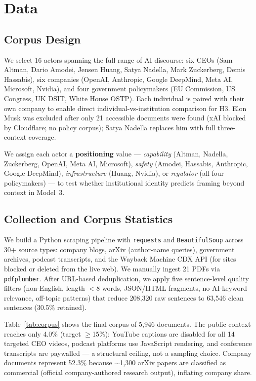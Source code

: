 \documentclass[11pt,a4paper,twocolumn]{article}
\begin{document}
\section{Data}

\subsection{Corpus Design}

We select 16 actors spanning the full range of AI discourse: six CEOs (Sam
Altman, Dario Amodei, Jensen Huang, Satya Nadella, Mark Zuckerberg, Demis
Hassabis), six companies (OpenAI, Anthropic, Google DeepMind, Meta AI,
Microsoft, Nvidia), and four government policymakers (EU Commission, US Congress,
UK DSIT, White House OSTP). Each individual is paired with their own company
to enable direct individual-vs-institution comparison for H3. Elon Musk was
excluded after only 21 accessible documents were found (xAI blocked by
Cloudflare; no policy corpus); Satya Nadella replaces him with full
three-context coverage.

We assign each actor a \textbf{positioning} value — \textit{capability}
(Altman, Nadella, Zuckerberg, OpenAI, Meta AI, Microsoft), \textit{safety}
(Amodei, Hassabis, Anthropic, Google DeepMind), \textit{infrastructure}
(Huang, Nvidia), or \textit{regulator} (all four policymakers) — to test
whether institutional identity predicts framing beyond context in Model~3.

\subsection{Collection and Corpus Statistics}

We build a Python scraping pipeline with \texttt{requests} and
\texttt{BeautifulSoup} across 30+ source types: company blogs, arXiv
(author-name queries), government archives, podcast transcripts, and the
Wayback Machine CDX API (for sites blocked or deleted from the live web).
We manually ingest 21 PDFs via \texttt{pdfplumber}. After URL-based
deduplication, we apply five sentence-level quality filters
(non-English, length $<$8 words, JSON/HTML fragments, no AI-keyword relevance,
off-topic patterns) that reduce 208,320 raw sentences to 63,546 clean
sentences (30.5\% retained).

Table~\ref{tab:corpus} shows the final corpus of 5,946 documents.
The public context reaches only 4.0\% (target $\geq$15\%): YouTube captions
are disabled for all 14 targeted CEO videos, podcast platforms use
JavaScript rendering, and conference transcripts are paywalled — a structural
ceiling, not a sampling choice. Company documents represent 52.3\% because
$\sim$1{,}300 arXiv papers are classified as commercial (official
company-authored research output), inflating company share.
\end{document}
